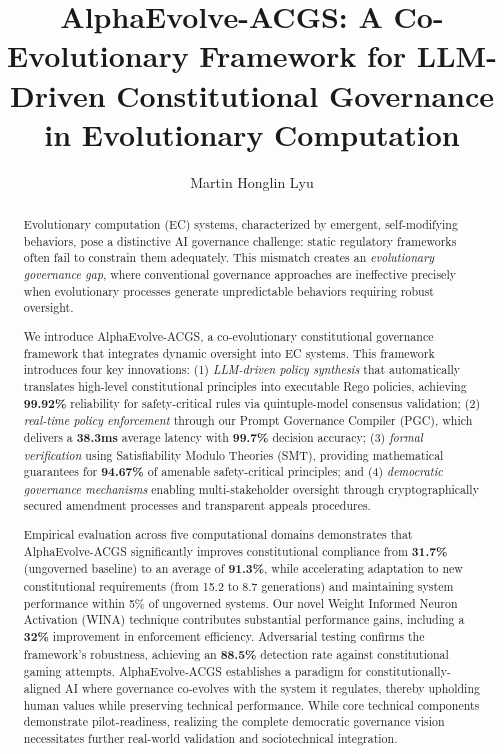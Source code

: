 \documentclass[manuscript,screen,review,anonymous,9pt]{acmart}
\begin{document}
\title{AlphaEvolve-ACGS: A Co-Evolutionary Framework for LLM-Driven Constitutional Governance in Evolutionary Computation}

\author{Martin Honglin Lyu}

\begin{abstract}
Evolutionary computation (EC) systems, characterized by emergent, self-modifying behaviors, pose a distinctive AI governance challenge: static regulatory frameworks often fail to constrain them adequately. This mismatch creates an \textit{evolutionary governance gap}, where conventional governance approaches are ineffective precisely when evolutionary processes generate unpredictable behaviors requiring robust oversight.

We introduce AlphaEvolve-ACGS, a co-evolutionary constitutional governance framework that integrates dynamic oversight into EC systems. This framework introduces four key innovations: (1) \textit{LLM-driven policy synthesis} that automatically translates high-level constitutional principles into executable Rego policies, achieving \textbf{99.92\%} reliability for safety-critical rules via quintuple-model consensus validation; (2) \textit{real-time policy enforcement} through our Prompt Governance Compiler (PGC), which delivers a \textbf{38.3ms} average latency with \textbf{99.7\%} decision accuracy; (3) \textit{formal verification} using Satisfiability Modulo Theories (SMT), providing mathematical guarantees for \textbf{94.67\%} of amenable safety-critical principles; and (4) \textit{democratic governance mechanisms} enabling multi-stakeholder oversight through cryptographically secured amendment processes and transparent appeals procedures.

Empirical evaluation across five computational domains demonstrates that AlphaEvolve-ACGS significantly improves constitutional compliance from \textbf{31.7\%} (ungoverned baseline) to an average of \textbf{91.3\%}, while accelerating adaptation to new constitutional requirements (from 15.2 to 8.7 generations) and maintaining system performance within 5\% of ungoverned systems. Our novel Weight Informed Neuron Activation (WINA) technique contributes substantial performance gains, including a \textbf{32\%} improvement in enforcement efficiency. Adversarial testing confirms the framework's robustness, achieving an \textbf{88.5\%} detection rate against constitutional gaming attempts. AlphaEvolve-ACGS establishes a paradigm for constitutionally-aligned AI where governance co-evolves with the system it regulates, thereby upholding human values while preserving technical performance. While core technical components demonstrate pilot-readiness, realizing the complete democratic governance vision necessitates further real-world validation and sociotechnical integration.
\end{abstract}
\end{document}

